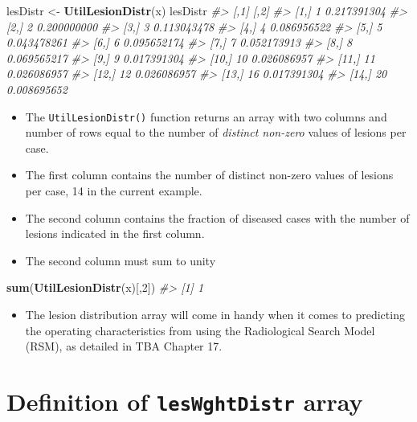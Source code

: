 \documentclass[
]{book}
\newenvironment{Shaded}{\begin{snugshade}}{\end{snugshade}}
\newcommand{\CommentTok}[1]{\textcolor[rgb]{0.56,0.35,0.01}{\textit{#1}}}
\newcommand{\DecValTok}[1]{\textcolor[rgb]{0.00,0.00,0.81}{#1}}
\newcommand{\KeywordTok}[1]{\textcolor[rgb]{0.13,0.29,0.53}{\textbf{#1}}}
\newcommand{\NormalTok}[1]{#1}
\newcommand{\StringTok}[1]{\textcolor[rgb]{0.31,0.60,0.02}{#1}}
\providecommand{\tightlist}{%
  \setlength{\itemsep}{0pt}\setlength{\parskip}{0pt}}
\begin{document}
\begin{Shaded}
\begin{Highlighting}[]
\NormalTok{lesDistr <-}\StringTok{ }\KeywordTok{UtilLesionDistr}\NormalTok{(x)}
\NormalTok{lesDistr}
\CommentTok{#>       [,1]        [,2]}
\CommentTok{#>  [1,]    1 0.217391304}
\CommentTok{#>  [2,]    2 0.200000000}
\CommentTok{#>  [3,]    3 0.113043478}
\CommentTok{#>  [4,]    4 0.086956522}
\CommentTok{#>  [5,]    5 0.043478261}
\CommentTok{#>  [6,]    6 0.095652174}
\CommentTok{#>  [7,]    7 0.052173913}
\CommentTok{#>  [8,]    8 0.069565217}
\CommentTok{#>  [9,]    9 0.017391304}
\CommentTok{#> [10,]   10 0.026086957}
\CommentTok{#> [11,]   11 0.026086957}
\CommentTok{#> [12,]   12 0.026086957}
\CommentTok{#> [13,]   16 0.017391304}
\CommentTok{#> [14,]   20 0.008695652}
\end{Highlighting}
\end{Shaded}

\begin{itemize}
\tightlist
\item
  The \texttt{UtilLesionDistr()} function returns an array with two columns and number of rows equal to the number of \emph{distinct non-zero} values of lesions per case.
\item
  The first column contains the number of distinct non-zero values of lesions per case, 14 in the current example.
\item
  The second column contains the fraction of diseased cases with the number of lesions indicated in the first column.
\item
  The second column must sum to unity
\end{itemize}

\begin{Shaded}
\begin{Highlighting}[]
\KeywordTok{sum}\NormalTok{(}\KeywordTok{UtilLesionDistr}\NormalTok{(x)[,}\DecValTok{2}\NormalTok{])}
\CommentTok{#> [1] 1}
\end{Highlighting}
\end{Shaded}

\begin{itemize}
\tightlist
\item
  The lesion distribution array will come in handy when it comes to predicting the operating characteristics from using the Radiological Search Model (RSM), as detailed in TBA Chapter 17.
\end{itemize}

\hypertarget{quick-start-froc-data-lesion-weights}{%
\section{\texorpdfstring{Definition of \texttt{lesWghtDistr} array}{Definition of lesWghtDistr array}}\label{quick-start-froc-data-lesion-weights}}
\end{document}
